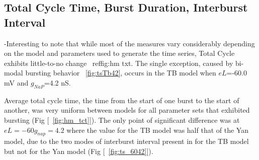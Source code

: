 \documentclass[11pt]{article}
\begin{document}
\subsection{Total Cycle Time, Burst Duration, Interburst Interval}


-Interesting to note that while most of the measures vary considerably depending on the model and parameters used to generate the time series, Total Cycle exhibits little-to-no change ~ref{fig:hm txt}. The single exception, caused by bi-modal bursting behavior ~\ref{fig:tsTb42}, occurs in the TB model when $eL$=-60.0 mV and $g_{NaP}$=4.2 nS. 

Average total cycle time, the time from the start of one burst to the start of another, was very uniform between models for all parameter sets that exhibited bursting (Fig [~\ref{fig:hm_tct}]). The only point of significant difference was at $eL=-60 g_{nap} = 4.2$ where the value for the TB model was half that of the Yan model, due to the two modes of interburst interval present in for the TB model but not for the Yan model (Fig [~\ref{fig:ts_6042}]).
\end{document}

